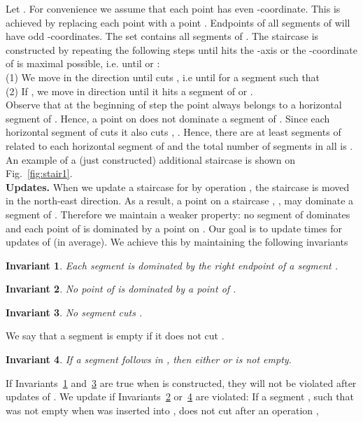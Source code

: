 \documentclass[10pt]{llncs}
\newtheorem{invariant}{Invariant}
\begin{document}
Let . For convenience we assume that each point  has 
even -coordinate. This is achieved by replacing each point 
 with a point . Endpoints of all 
segments of  will have odd -coordinates.
The set  contains all  segments of 
. 
The staircase is constructed by repeating the following steps 
until  hits the -axis or the -coordinate of  is maximal possible,
 i.e. until  or : \\
(1) We move  in the  direction until  cuts , 
i.e until  for a segment  such that 
\\
(2) If , we move  in  direction until it hits 
a segment of  or . \\
Observe that at the beginning of step  the point  always belongs 
to a horizontal segment of . Hence, a point on  does 
not dominate a segment of . 
Since each horizontal segment 
of  cuts  it also cuts , . 
Hence, there are at least  segments of  related to each horizontal 
segment of  and the total number of segments in all  
is .  
An example of 
a (just constructed) additional staircase is shown on
 Fig.~\ref{fig:stair1}. \\
{\bf Updates.} 
When we update a staircase  for 
 by operation , the 
staircase is moved in the north-east direction. As a result, 
a point on a staircase , , may dominate a segment 
of . Therefore  we maintain a weaker property: 
no segment of  
dominates  and each point of  is dominated by a 
point on .   Our goal is to update  
 times for  updates of  (in average). 
We achieve this by maintaining the following invariants
\begin{invariant}\label{inv:dom1}
Each segment  is dominated by  the right endpoint of a segment 
.
\end{invariant}
\begin{invariant}\label{inv:dom2}
No point of  is dominated by a point of .
\end{invariant}
\begin{invariant}\label{inv:cut}
No segment  cuts .
\end{invariant}
We say that a segment  is empty if it does not cut .
\begin{invariant}\label{inv:empty}
If a segment  follows  in , then 
either  or  is not empty. 
\end{invariant}
If Invariants~\ref{inv:dom1} and~\ref{inv:cut} are true when  
is constructed, they will not be violated after updates of . 
We update  if Invariants~\ref{inv:dom2} or~\ref{inv:empty}
are violated: If a  segment , such that  was not empty
when  was inserted into ,  
does not cut  after an operation , 
\end{document}
